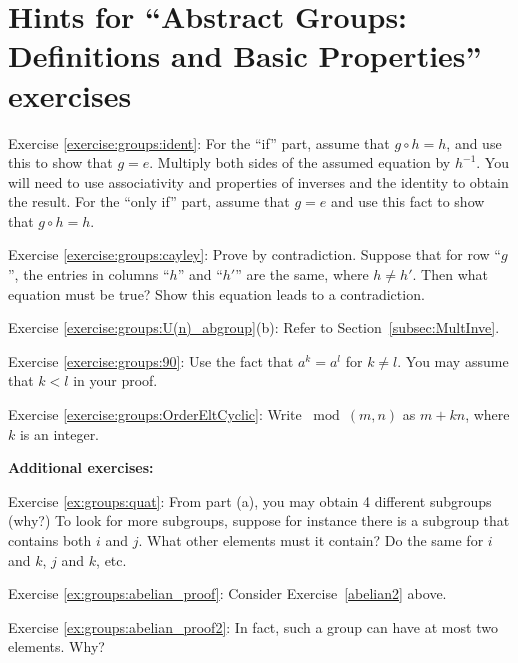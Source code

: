 \section{Hints for ``Abstract Groups: Definitions and Basic Properties'' exercises}\label{sec:groups:hints}

\noindent Exercise \ref{exercise:groups:ident}: For the ``if'' part, assume that $g \circ h = h$, and use this to show that $g = e$. Multiply both sides of the assumed equation by $h^{-1}$. You will need to use associativity and properties of inverses and the identity to obtain the result.  For the ``only if'' part, assume that $g=e$ and use this fact to show that $g \circ h = h$.

\noindent Exercise \ref{exercise:groups:cayley}: Prove by contradiction. Suppose that for row ``$g$'', the entries in columns ``$h$'' and ``$h'$'' are the same, where $h \neq h'$.  Then what equation must be true? Show this equation leads to a contradiction.

\noindent Exercise \ref{exercise:groups:U(n)_abgroup}(b): Refer to Section~\ref{subsec:MultInve}.

\noindent Exercise \ref{exercise:groups:90}: Use the fact that $a^k = a^l$ for $k \neq l$.  You may assume that $k < l$ in your proof.

\noindent Exercise \ref{exercise:groups:OrderEltCyclic}: Write $\bmod(m,n)$ as $m + kn$, where $k$ is an integer.

\bigskip

\textbf{Additional exercises:}

\noindent Exercise \ref{ex:groups:quat}: From part (a), you may obtain 4 different subgroups (why?)  To look for more subgroups, suppose for instance there is a subgroup that contains both $i$ and $j$.  What other elements must it contain?  Do the same for $i$ and $k$, $j$ and $k$, etc.

\noindent Exercise \ref{ex:groups:abelian_proof}: Consider Exercise~\ref{abelian2} above.

\noindent Exercise \ref{ex:groups:abelian_proof2}: In fact, such a group can have at most two elements.  Why?
